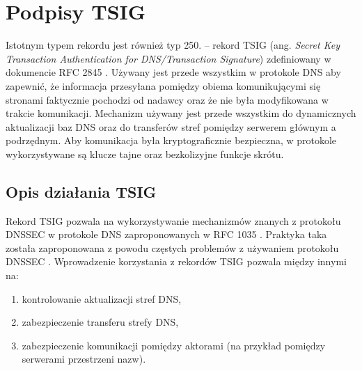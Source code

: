 \section{Podpisy TSIG}
\label{TSIG}
Istotnym typem rekordu jest również typ 250. -- rekord TSIG (ang. \textit{Secret Key Transaction Authentication for DNS/Transaction
Signature}) zdefiniowany w dokumencie RFC 2845 \cite{RFC2845}. Używany jest przede wszystkim w protokole DNS aby zapewnić, że
informacja przesyłana pomiędzy obiema komunikującymi się stronami faktycznie pochodzi od nadawcy oraz że nie była modyfikowana w
trakcie komunikacji. Mechanizm używany jest przede wszystkim do dynamicznych aktualizacji baz DNS oraz do transferów stref pomiędzy
serwerem głównym a podrzędnym. Aby komunikacja była kryptograficznie bezpieczna, w protokole wykorzystywane są klucze tajne oraz
bezkolizyjne funkcje skrótu.

\subsection{Opis działania TSIG}
\label{tsig}
Rekord TSIG pozwala na wykorzystywanie mechanizmów znanych z protokołu DNSSEC \cite{nask-tsig} w protokole DNS zaproponowanych w
RFC 1035 \cite{RFC1035}. Praktyka taka została zaproponowana z powodu częstych problemów z używaniem protokołu
DNSSEC \cite{RFC4033, RFC4035}. Wprowadzenie korzystania z rekordów TSIG pozwala między innymi na:
\begin{enumerate}
	\item kontrolowanie aktualizacji stref DNS,
	\item zabezpieczenie transferu strefy DNS,
	\item zabezpieczenie komunikacji pomiędzy aktorami (na przykład pomiędzy serwerami przestrzeni nazw).
\end{enumerate}

